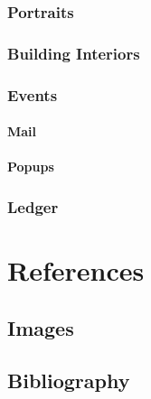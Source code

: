 \documentclass[12pt, a4paper]{scrreprt}
\begin{document}
	\section{Portraits}
	\section{Building Interiors}
	\section{Events}
	\subsection{Mail}
	\subsection{Popups}
	\section{Ledger}
	\part{References}
	\chapter{Images}
	\chapter{Bibliography}
\end{document}
